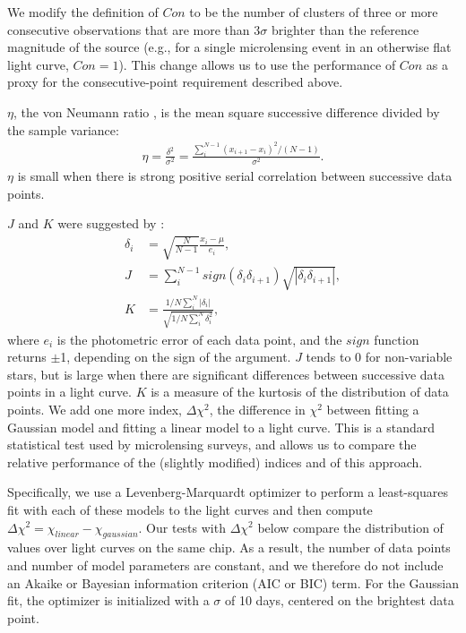 \documentclass{emulateapj}
\begin{document}
We modify the definition of $Con$ to be the number of clusters of three or more consecutive observations that are more than $3\sigma$ brighter than the reference magnitude of the source (e.g., for a single microlensing event in an otherwise flat light curve, $Con=1$). This change allows us to use the performance of $Con$ as a proxy for the consecutive-point requirement described above. 

$\eta$, the von Neumann ratio \citep[also known as the Durbin-Watson statistic;][]{von_neumann1941, durbin50}, is the mean square successive difference divided by the sample variance:
\begin{align}
	\eta = \frac{\delta^2}{\sigma^2} = \frac{\sum^{N-1}_i(x_{i+1} - x_i)^2/(N-1)}{\sigma^2}.
\end{align}
$\eta$ is small when there is strong positive serial correlation between successive data points. 

$J$ and $K$ were suggested by \cite{stetson1996}:
\begin{align}
	\delta_i &= \sqrt{\frac{N}{N-1}}\frac{x_i-\mu}{e_i},\\
	J &= \sum^{N-1}_i sign(\delta_i \delta_{i+1})\sqrt{|\delta_i \delta_{i+1}|},\\
	K &= \frac{1/N\sum^N_i |\delta_i|}{\sqrt{1/N\sum^N_i\delta_i^2}},
\end{align}
where $e_i$ is the photometric error of each data point, and the $sign$ function returns $\pm$1, depending on the sign of the argument. $J$ tends to 0 for non-variable stars, but is large when there are significant differences between successive data points in a light curve. $K$ is a measure of the kurtosis of the distribution of data points. We add one more index, $\Delta \chi^2$, the difference in $\chi^2$ between fitting a Gaussian model and fitting a linear model to a light curve. This is a standard statistical test used by microlensing surveys, and allows us to compare the relative performance of the (slightly modified) \cite{shin2009} indices and of this approach.

Specifically, we use a Levenberg-Marquardt optimizer to perform a least-squares fit with each of these models to the light curves and then compute $\Delta\chi^2=\chi_{linear} - \chi_{gaussian}$. Our tests with $\Delta \chi^2$ below compare the distribution of values over light curves on the same chip. As a result, the number of data points and number of model parameters are constant, and we therefore do not include an Akaike or Bayesian information criterion (AIC or BIC) term. For the Gaussian fit, the optimizer is initialized with a $\sigma$ of 10 days, centered on the brightest data point.
\end{document}
